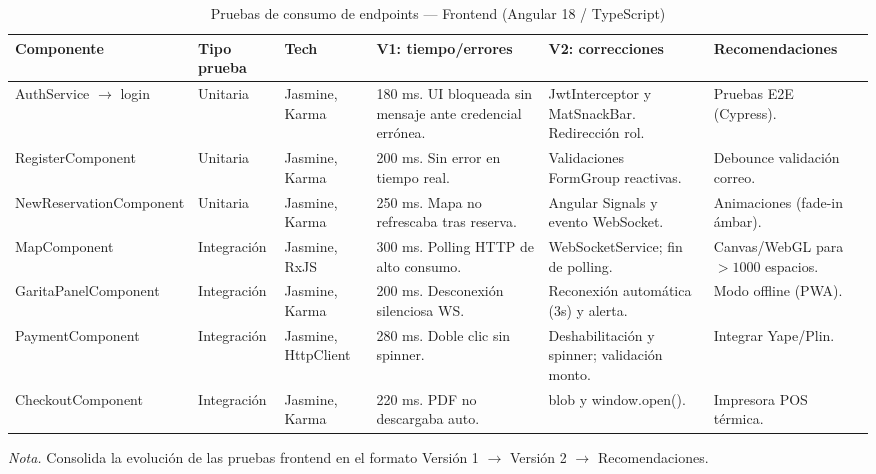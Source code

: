 \begin{table}[htbp]
\caption{Pruebas de consumo de endpoints — Frontend (Angular 18 / TypeScript)}
\label{tab:pruebas_frontend}
\begin{tabular}{@{}p{3.5cm} p{2.0cm} p{2cm} p{2.5cm} p{3cm} p{2.5cm}@{}}
\toprule
\textbf{Componente} & \textbf{Tipo prueba} & \textbf{Tech} & \textbf{V1: tiempo/errores} & \textbf{V2: correcciones} & \textbf{Recomendaciones} \\
\midrule
AuthService $\rightarrow$ login & Unitaria & Jasmine, Karma & 180 ms. UI bloqueada sin mensaje ante credencial errónea. & JwtInterceptor y MatSnackBar. Redirección rol. & Pruebas E2E (Cypress). \\
RegisterComponent & Unitaria & Jasmine, Karma & 200 ms. Sin error en tiempo real. & Validaciones FormGroup reactivas. & Debounce validación correo. \\
NewReservationComponent & Unitaria & Jasmine, Karma & 250 ms. Mapa no refrescaba tras reserva. & Angular Signals y evento WebSocket. & Animaciones (fade-in ámbar). \\
MapComponent & Integración & Jasmine, RxJS & 300 ms. Polling HTTP de alto consumo. & WebSocketService; fin de polling. & Canvas/WebGL para $>1000$ espacios. \\
GaritaPanelComponent & Integración & Jasmine, Karma & 200 ms. Desconexión silenciosa WS. & Reconexión automática (3s) y alerta. & Modo offline (PWA). \\
PaymentComponent & Integración & Jasmine, HttpClient & 280 ms. Doble clic sin spinner. & Deshabilitación y spinner; validación monto. & Integrar Yape/Plin. \\
CheckoutComponent & Integración & Jasmine, Karma & 220 ms. PDF no descargaba auto. & blob y window.open(). & Impresora POS térmica. \\
\bottomrule
\end{tabular}
\par\vspace{0.2cm}
\textit{Nota.} Consolida la evolución de las pruebas frontend en el formato Versión 1 $\rightarrow$ Versión 2 $\rightarrow$ Recomendaciones.
\end{table}

